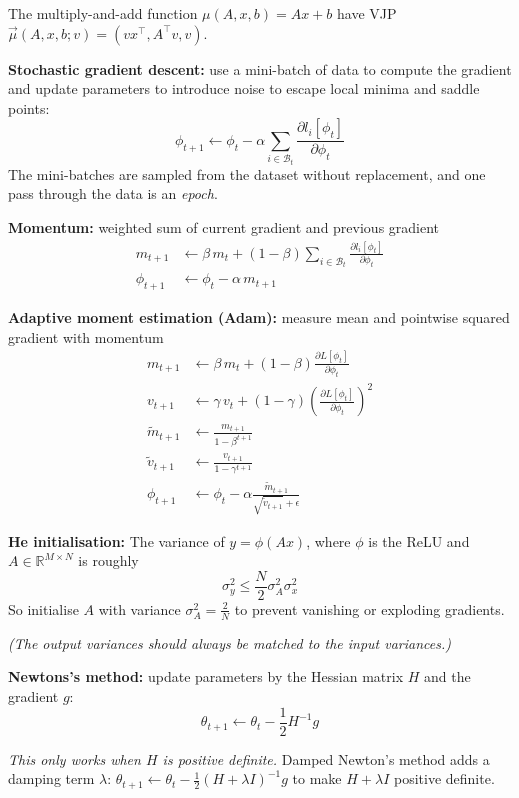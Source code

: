\documentclass[12pt]{article}
\begin{document}
The multiply-and-add function $\mu(A, x, b) = Ax + b$ have VJP $\vec{\mu}(A, x, b; v) = (v x^\top, A^\top v, v)$.


\textbf{Stochastic gradient descent:} use a mini-batch of data to compute the gradient and update parameters to introduce noise to escape local minima and saddle points:
$$
\phi_{t+1} \leftarrow \phi_t - \alpha \sum_{i \in \mathcal{B}_t} \frac{\partial l_i[\phi_t]}{\partial \phi_t}
$$
The mini-batches are sampled from the dataset without replacement, and one pass through the data is an \textit{epoch}.

\textbf{Momentum:} weighted sum of current gradient and previous gradient
\begin{align*}
    m_{t+1} &\leftarrow \beta \, m_t + (1 - \beta) \sum_{i \in \mathcal{B}_t} \frac{\partial l_i[\phi_t]}{\partial \phi_t} \\
    \phi_{t+1} &\leftarrow \phi_t - \alpha \, m_{t+1}
\end{align*}

\textbf{Adaptive moment estimation (Adam):} measure mean and pointwise squared gradient with momentum
\begin{align*}
    m_{t+1} &\leftarrow \beta \, m_t + (1 - \beta)  \frac{\partial L[\phi_t]}{\partial \phi_t} \\
    v_{t+1} &\leftarrow \gamma \, v_t + (1 - \gamma) \left(\frac{\partial L[\phi_t]}{\partial \phi_t}\right)^2 \\
    \tilde{m}_{t+1} &\leftarrow \frac{m_{t+1}}{1 - \beta^{t+1}} \\
    \tilde{v}_{t+1} &\leftarrow \frac{v_{t+1}}{1 - \gamma^{t+1}} \\
    \phi_{t+1} &\leftarrow \phi_t - \alpha \frac{\tilde{m}_{t+1}}{\sqrt{\tilde{v}_{t+1}} + \epsilon}
\end{align*}

\textbf{He initialisation:} The variance of $y = \phi(Ax)$, where $\phi$ is the ReLU and $A \in \mathbb{R}^{M \times N}$ is roughly
$$\sigma_y^2 \leq \frac{N}{2} \sigma_A^2 \sigma_x^2$$
So initialise $A$ with variance $\sigma_A^2 = \frac{2}{N}$ to prevent vanishing or exploding gradients.

\textit{(The output variances should always be matched to the input variances.)}

\textbf{Newtons's method:} update parameters by the Hessian matrix $H$ and the gradient $g$:
$$
\theta_{t+1} \leftarrow \theta_t - \frac{1}{2}H^{-1} g
$$

\textit{This only works when $H$ is positive definite.} Damped Newton's method adds a damping term $\lambda$: $\theta_{t+1} \leftarrow \theta_t - \frac{1}{2}(H + \lambda I)^{-1} g$ to make $H + \lambda I$ positive definite.
\end{document}
